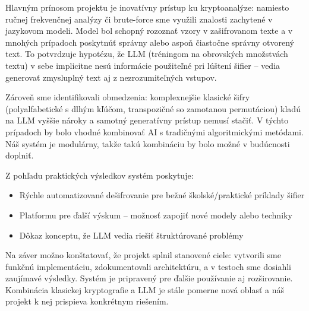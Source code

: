 \documentclass[12pt,a4paper]{article}
\begin{document}
Hlavným prínosom projektu je inovatívny prístup ku kryptoanalýze: namiesto ručnej frekvenčnej analýzy či brute-force sme využili znalosti zachytené v jazykovom modeli. Model bol schopný rozoznať vzory v zašifrovanom texte a v mnohých prípadoch poskytnúť správny alebo aspoň čiastočne správny otvorený text. To potvrdzuje hypotézu, že LLM (tréningom na obrovských množstvách textu) v sebe implicitne nesú informácie použiteľné pri lúštení šifier -- vedia generovať zmysluplný text aj z nezrozumiteľných vstupov.

Zároveň sme identifikovali obmedzenia: komplexnejšie klasické šifry (polyalfabetické s dlhým kľúčom, transpozičné so zamotanou permutáciou) kladú na LLM vyššie nároky a samotný generatívny prístup nemusí stačiť. V týchto prípadoch by bolo vhodné kombinovať AI s tradičnými algoritmickými metódami. Náš systém je modulárny, takže takú kombináciu by bolo možné v budúcnosti doplniť.

Z pohľadu praktických výsledkov systém poskytuje:
\begin{itemize}
    \item Rýchle automatizované dešifrovanie pre bežné školské/praktické príklady šifier
    \item Platformu pre ďalší výskum -- možnosť zapojiť nové modely alebo techniky
    \item Dôkaz konceptu, že LLM vedia riešiť štruktúrované problémy
\end{itemize}

Na záver možno konštatovať, že projekt splnil stanovené ciele: vytvorili sme funkčnú implementáciu, zdokumentovali architektúru, a v testoch sme dosiahli zaujímavé výsledky. Systém je pripravený pre ďalšie používanie aj rozširovanie. Kombinácia klasickej kryptografie a LLM je stále pomerne nová oblasť a náš projekt k nej prispieva konkrétnym riešením.
\end{document}
